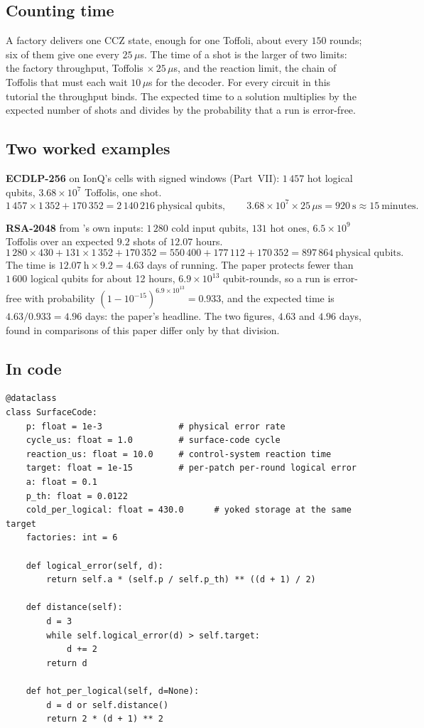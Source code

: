 \subsection{Counting time}

A factory delivers one CCZ state, enough for one Toffoli, about every $150$ rounds; six of them give
one every $25\,\mu$s. The time of a shot is the larger of two limits: the factory throughput,
Toffolis $\times\,25\,\mu$s, and the reaction limit, the chain of Toffolis that must each wait
$10\,\mu$s for the decoder. For every circuit in this tutorial the throughput binds. The expected
time to a solution multiplies by the expected number of shots and divides by the probability that
a run is error-free.

\subsection{Two worked examples}

\textbf{ECDLP-256} on IonQ's cells with signed windows (Part~VII): $1\,457$ hot logical qubits,
$3.68\times10^7$ Toffolis, one shot.
\[ 1\,457\times1\,352+170\,352=2\,140\,216\ \text{physical qubits},\qquad
   3.68\times10^{7}\times25\,\mu\text{s}=920\ \text{s}\approx15\ \text{minutes}. \]

\textbf{RSA-2048} from \cite{ec:gidney25rsa}'s own inputs: $1\,280$ cold input qubits, $131$ hot
ones, $6.5\times10^9$ Toffolis over an expected $9.2$ shots of $12.07$ hours.
\[ 1\,280\times430+131\times1\,352+170\,352=550\,400+177\,112+170\,352=897\,864\ \text{physical qubits}. \]
The time is $12.07\ \text{h}\times9.2=4.63$ days of running. The paper protects fewer than
$1\,600$ logical qubits for about 12 hours, $6.9\times10^{13}$ qubit-rounds, so a run is
error-free with probability $(1-10^{-15})^{6.9\times10^{13}}=0.933$, and the expected time is
$4.63/0.933=4.96$ days: the paper's headline. The two figures, $4.63$ and $4.96$ days, found in
comparisons of this paper differ only by that division.

\subsection{In code}

\begin{lstlisting}
@dataclass
class SurfaceCode:
    p: float = 1e-3               # physical error rate
    cycle_us: float = 1.0         # surface-code cycle
    reaction_us: float = 10.0     # control-system reaction time
    target: float = 1e-15         # per-patch per-round logical error
    a: float = 0.1
    p_th: float = 0.0122
    cold_per_logical: float = 430.0      # yoked storage at the same target
    factories: int = 6

    def logical_error(self, d):
        return self.a * (self.p / self.p_th) ** ((d + 1) / 2)

    def distance(self):
        d = 3
        while self.logical_error(d) > self.target:
            d += 2
        return d

    def hot_per_logical(self, d=None):
        d = d or self.distance()
        return 2 * (d + 1) ** 2
\end{lstlisting}

